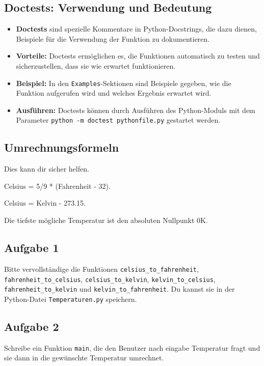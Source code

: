 \documentclass{article}
\begin{document}
\subsection*{Doctests: Verwendung und Bedeutung}

\begin{itemize}
    \item \textbf{Doctests} sind spezielle Kommentare in Python-Docstrings, die dazu dienen, Beispiele für die Verwendung der Funktion zu dokumentieren.
    \item \textbf{Vorteile:} Doctests ermöglichen es, die Funktionen automatisch zu testen und sicherzustellen, dass sie wie erwartet funktionieren.
    \item \textbf{Beispiel:} In den \texttt{Examples}-Sektionen sind Beispiele gegeben, wie die Funktion aufgerufen wird und welches Ergebnis erwartet wird.
    \item \textbf{Ausführen:} Doctests können durch Ausführen des Python-Moduls mit dem Parameter \texttt{python -m doctest pythonfile.py} gestartet werden.
\end{itemize}

\subsection*{Umrechnungsformeln}
\begin{tcolorbox}[colback=red!5!white,colframe=red!75!black]
    Dies kann dir sicher helfen.

    Celsius = 5/9 * (Fahrenheit - 32).

    Celsius = Kelvin - 273.15.

    Die tiefste mögliche Temperatur ist den absoluten Nullpunkt 0K.

  \end{tcolorbox}

\subsection*{Aufgabe 1}
Bitte vervollständige die Funktionen \texttt{celsius\_to\_fahrenheit}, \texttt{fahrenheit\_to\_celsius}, \texttt{celsius\_to\_kelvin}, \texttt{kelvin\_to\_celsius}, \texttt{fahrenheit\_to\_kelvin} und \texttt{kelvin\_to\_fahrenheit}.
Du kannst sie in der Python-Datei \texttt{Temperaturen.py} speichern.
\subsection*{Aufgabe 2}
Schreibe ein Funktion \texttt{main}, die den Benutzer nach eingabe Temperatur fragt und sie dann in die gewünschte Temperatur umrechnet.
\end{document}
